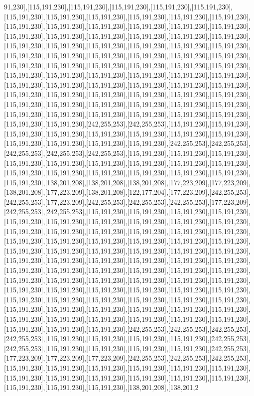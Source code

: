 91,230],[115,191,230],[115,191,230],[115,191,230],[115,191,230],[115,191,230],[115,191,230],[115,191,230],[115,191,230],[115,191,230],[115,191,230],[115,191,230],[115,191,230],[115,191,230],[115,191,230],[115,191,230],[115,191,230],[115,191,230],[115,191,230],[115,191,230],[115,191,230],[115,191,230],[115,191,230],[115,191,230],[115,191,230],[115,191,230],[115,191,230],[115,191,230],[115,191,230],[115,191,230],[115,191,230],[115,191,230],[115,191,230],[115,191,230],[115,191,230],[115,191,230],[115,191,230],[115,191,230],[115,191,230],[115,191,230],[115,191,230],[115,191,230],[115,191,230],[115,191,230],[115,191,230],[115,191,230],[115,191,230],[115,191,230],[115,191,230],[115,191,230],[115,191,230],[115,191,230],[115,191,230],[115,191,230],[115,191,230],[115,191,230],[115,191,230],[115,191,230],[115,191,230],[115,191,230],[115,191,230],[115,191,230],[115,191,230],[115,191,230],[115,191,230],[115,191,230],[115,191,230],[115,191,230],[115,191,230],[115,191,230],[115,191,230],[115,191,230],[115,191,230],[115,191,230],[242,255,253],[242,255,253],[115,191,230],[115,191,230],[115,191,230],[115,191,230],[115,191,230],[115,191,230],[115,191,230],[115,191,230],[115,191,230],[115,191,230],[115,191,230],[115,191,230],[242,255,253],[242,255,253],[242,255,253],[242,255,253],[242,255,253],[115,191,230],[115,191,230],[115,191,230],[115,191,230],[115,191,230],[115,191,230],[115,191,230],[115,191,230],[115,191,230],[115,191,230],[115,191,230],[115,191,230],[115,191,230],[115,191,230],[115,191,230],[115,191,230],[138,201,208],[138,201,208],[138,201,208],[177,223,209],[177,223,209],[138,201,208],[177,223,209],[138,201,208],[122,177,204],[177,223,209],[242,255,253],[242,255,253],[177,223,209],[242,255,253],[242,255,253],[242,255,253],[177,223,209],[242,255,253],[242,255,253],[115,191,230],[115,191,230],[115,191,230],[115,191,230],[115,191,230],[115,191,230],[115,191,230],[115,191,230],[115,191,230],[115,191,230],[115,191,230],[115,191,230],[115,191,230],[115,191,230],[115,191,230],[115,191,230],[115,191,230],[115,191,230],[115,191,230],[115,191,230],[115,191,230],[115,191,230],[115,191,230],[115,191,230],[115,191,230],[115,191,230],[115,191,230],[115,191,230],[115,191,230],[115,191,230],[115,191,230],[115,191,230],[115,191,230],[115,191,230],[115,191,230],[115,191,230],[115,191,230],[115,191,230],[115,191,230],[115,191,230],[115,191,230],[115,191,230],[115,191,230],[115,191,230],[115,191,230],[115,191,230],[115,191,230],[115,191,230],[115,191,230],[115,191,230],[115,191,230],[115,191,230],[115,191,230],[115,191,230],[115,191,230],[115,191,230],[115,191,230],[115,191,230],[115,191,230],[115,191,230],[115,191,230],[115,191,230],[115,191,230],[115,191,230],[115,191,230],[115,191,230],[115,191,230],[115,191,230],[115,191,230],[115,191,230],[115,191,230],[115,191,230],[115,191,230],[242,255,253],[242,255,253],[242,255,253],[242,255,253],[115,191,230],[115,191,230],[115,191,230],[115,191,230],[242,255,253],[242,255,253],[115,191,230],[115,191,230],[115,191,230],[115,191,230],[242,255,253],[177,223,209],[177,223,209],[177,223,209],[242,255,253],[242,255,253],[242,255,253],[115,191,230],[115,191,230],[115,191,230],[115,191,230],[115,191,230],[115,191,230],[115,191,230],[115,191,230],[115,191,230],[115,191,230],[115,191,230],[115,191,230],[115,191,230],[115,191,230],[115,191,230],[138,201,208],[138,201,2